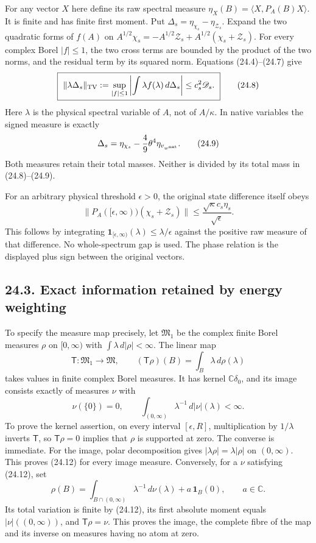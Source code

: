 \documentclass[
]{article}
\begin{document}
For any vector \(X\) here define its raw spectral measure
\(\eta_X(B)=\langle X,P_A(B)X\rangle\). It is finite and has finite
first moment. Put \(\Delta_s=\eta_{\chi_s}-\eta_{\mathcal Z_s}\). Expand
the two quadratic forms of \(f(A)\) on
\(A^{1/2}\chi_s=-A^{1/2}\mathcal Z_s
                   +A^{1/2}(\chi_s+\mathcal Z_s)\). For every complex
Borel \(|f|\le1\), the two cross terms are bounded by the product of the
two norms, and the residual term by its squared norm. Equations
(24.4)--(24.7) give \[
\boxed{\ 
\|\lambda\Delta_s\|_{\rm TV}
 :=\sup_{|f|\le1}\left|\int\lambda f(\lambda)\,d\Delta_s\right|
 \le c_s^2\mathscr D_s .\ }
\tag{24.8}
\] Here \(\lambda\) is the physical spectral variable of \(A\), not of
\(A/\kappa\). In native variables the signed measure is exactly \[
\Delta_s=\eta_{\chi_s}-\frac49\theta^4\eta_{v_{w^{\rm nat}}}.
\tag{24.9}
\] Both measures retain their total masses. Neither is divided by its
total mass in (24.8)--(24.9).

For an arbitrary physical threshold \(\epsilon>0\), the original state
difference itself obeys \[
\|P_A([\epsilon,\infty))(\chi_s+\mathcal Z_s)\|
 \le \frac{\sqrt\kappa c_s\eta_s}{\sqrt\epsilon}.
\tag{24.10}
\] This follows by integrating
\(\mathbf1_{[\epsilon,\infty)}(\lambda)\le\lambda/\epsilon\) against the
positive raw measure of that difference. No whole-spectrum gap is used.
The phase relation is the displayed plus sign between the original
vectors.

\subsection{24.3. Exact information retained by energy
weighting}\label{exact-information-retained-by-energy-weighting}

To specify the measure map precisely, let \(\mathfrak M_1\) be the
complex finite Borel measures \(\rho\) on \([0,\infty)\) with
\(\int\lambda\,d|\rho|<\infty\). The linear map \[
\mathsf T:\mathfrak M_1\longrightarrow\mathfrak M,\qquad
(\mathsf T\rho)(B)=\int_B\lambda\,d\rho(\lambda)
\tag{24.11}
\] takes values in finite complex Borel measures. It has kernel
\(\mathbb C\delta_0\), and its image consists exactly of measures
\(\nu\) with \[
\nu(\{0\})=0,\qquad
\int_{(0,\infty)}\lambda^{-1}\,d|\nu|(\lambda)<\infty .
\tag{24.12}
\] To prove the kernel assertion, on every interval \([\epsilon,R]\),
multiplication by \(1/\lambda\) inverts \(\mathsf T\), so
\(\mathsf T\rho=0\) implies that \(\rho\) is supported at zero. The
converse is immediate. For the image, polar decomposition gives
\(|\lambda\rho|=\lambda|\rho|\) on \((0,\infty)\). This proves (24.12)
for every image measure. Conversely, for a \(\nu\) satisfying (24.12),
set \[
\rho(B)=\int_{B\cap(0,\infty)}\lambda^{-1}\,d\nu(\lambda)
                         +a\,\mathbf1_B(0),\qquad a\in\mathbb C.
\tag{24.13}
\] Its total variation is finite by (24.12), its first absolute moment
equals \(|\nu|((0,\infty))\), and \(\mathsf T\rho=\nu\). This proves the
image, the complete fibre of the map and its inverse on measures having
no atom at zero.
\end{document}
